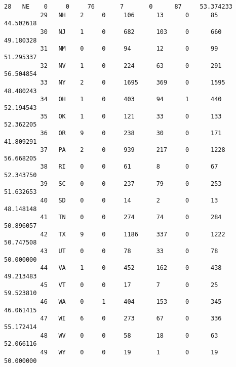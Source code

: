 \documentclass[11pt]{article}
\begin{document}
\begin{Verbatim}[commandchars=\\\{\}]
          28   NE    0     0     76       7       0      87     53.374233          
          29   NH    2     0     106      13      0      85     44.502618          
          30   NJ    1     0     682      103     0      660    49.180328          
          31   NM    0     0     94       12      0      99     51.295337          
          32   NV    1     0     224      63      0      291    56.504854          
          33   NY    2     0     1695     369     0      1595   48.480243          
          34   OH    1     0     403      94      1      440    52.194543          
          35   OK    1     0     121      33      0      133    52.362205          
          36   OR    9     0     238      30      0      171    41.809291          
          37   PA    2     0     939      217     0      1228   56.668205          
          38   RI    0     0     61       8       0      67     52.343750          
          39   SC    0     0     237      79      0      253    51.632653          
          40   SD    0     0     14       2       0      13     48.148148          
          41   TN    0     0     274      74      0      284    50.896057          
          42   TX    9     0     1186     337     0      1222   50.747508          
          43   UT    0     0     78       33      0      78     50.000000          
          44   VA    1     0     452      162     0      438    49.213483          
          45   VT    0     0     17       7       0      25     59.523810          
          46   WA    0     1     404      153     0      345    46.061415          
          47   WI    6     0     273      67      0      336    55.172414          
          48   WV    0     0     58       18      0      63     52.066116          
          49   WY    0     0     19       1       0      19     50.000000          
          

\end{Verbatim}
\end{document}

